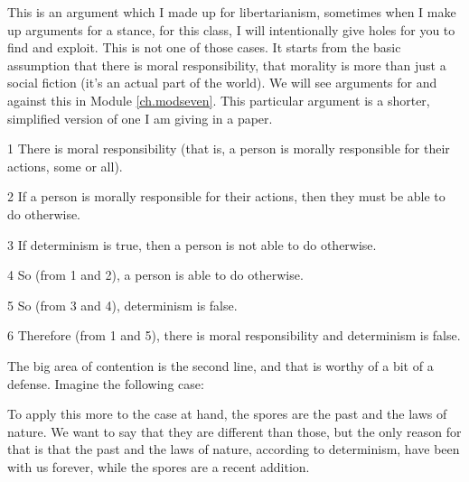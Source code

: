 This is an argument which I made up for libertarianism, sometimes when I make up arguments for a stance, for this class, I will intentionally give holes for you to find and exploit. This is not one of those cases. It starts from the basic assumption that there is moral responsibility, that morality is more than just a social fiction (it's an actual part of the world). We will see arguments for and against this in Module \ref{ch.modseven}. This particular argument is a shorter, simplified version of one I am giving in a paper.
\begin{earg}
    \item[1] There is moral responsibility (that is, a person is morally responsible for their actions, some or all).
    \item[2] If a person is morally responsible for their actions, then they must be able to do otherwise.
    \item[3] If determinism is true, then a person is not able to do otherwise.
    \item[4] So (from 1 and 2), a person is able to do otherwise.
    \item[5] So (from 3 and 4), determinism is false.
    \item[6] Therefore (from 1 and 5), there is moral responsibility and determinism is false.
\end{earg}
The big area of contention is the second line, and that is worthy of a bit of a defense. Imagine the following case:


To apply this more to the case at hand, the spores are the past and the laws of nature. We want to say that they are different than those, but the only reason for that is that the past and the laws of nature, according to determinism, have been with us forever, while the spores are a recent addition.
